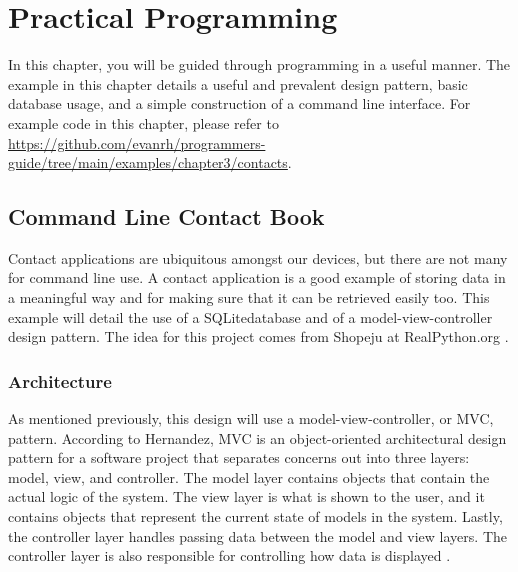 \documentclass[12pt, oneside, a4paper]{book}
\begin{document}
   \chapter{Practical Programming}
   \label{chap:practical}
      In this chapter, you will be guided through programming in a useful manner.
      The example in this chapter details a useful and prevalent design pattern, basic database usage, and a simple construction of a command line interface.
      For example code in this chapter, please refer to \url{https://github.com/evanrh/programmers-guide/tree/main/examples/chapter3/contacts}.

      \section{Command Line Contact Book}
      Contact applications are ubiquitous amongst our devices, but there are not many for command line use.
      A contact application is a good example of storing data in a meaningful way and for making sure that it can be retrieved easily too.
      This example will detail the use of a SQLite\footnotemark database and of a model-view-controller design pattern.
      The idea for this project comes from Shopeju at RealPython.org \autocite{shopeju13ProjectIdeas}.


      \subsection{Architecture}
      As mentioned previously, this design will use a model-view-controller, or MVC, pattern.
      According to Hernandez, MVC is an object-oriented architectural design pattern for a software project that separates concerns out into three layers: model, view, and controller.
      The model layer contains objects that contain the actual logic of the system.
      The view layer is what is shown to the user, and it contains objects that represent the current state of models in the system.
      Lastly, the controller layer handles passing data between the model and view layers.
      The controller layer is also responsible for controlling how data is displayed \autocite{hernandezModelViewController2021}.
\end{document}
